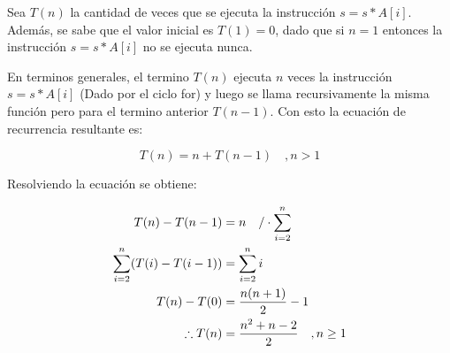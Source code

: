 
\begin{solution}
Sea $T(n)$ la cantidad de veces que se ejecuta la instrucción $s = s*A[i]$. Además, se sabe que el valor inicial es $T(1)=0$, dado que si $n=1$ entonces la instrucción $s = s*A[i]$ no se ejecuta nunca.

En terminos generales, el termino $T(n)$ ejecuta $n$ veces la instrucción $s = s*A[i]$ (Dado por el ciclo for) y luego se llama recursivamente la misma función pero para el termino anterior $T(n-1)$. Con esto la ecuación de recurrencia resultante es:

$$T(n) = n + T(n-1) \quad , n > 1$$

Resolviendo la ecuación se obtiene:

\begin{align*}
    T(n) - T(n-1) &=  n \quad \text{/}\cdot\sum\limits_{i=2}^{n} \\
    \sum\limits_{i=2}^{n}(T(i) - T(i-1)) &= \sum\limits_{i=2}^{n}i\\
    T(n) -T(0) &= \frac{n(n+1)}{2} - 1\\
    \therefore T(n) &= \frac{n^2 + n- 2}{2} \quad, n\ge 1
\end{align*}

\end{solution}